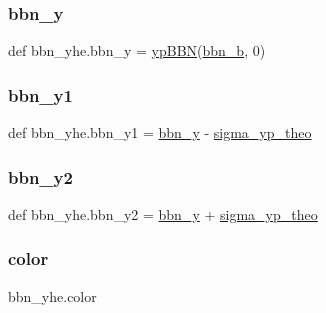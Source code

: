 \subsubsection{\texorpdfstring{bbn\+\_\+y}{bbn\_y}}
{\footnotesize\ttfamily def bbn\+\_\+yhe.\+bbn\+\_\+y = \mbox{\hyperlink{namespacebbn__yhe_a0ae2fc2b1719f17ae48ec9dee3de6728}{yp\+B\+BN}}(\mbox{\hyperlink{namespacebbn__yhe_a8da3e95ccabe26e7b02faafa8d0c7d0a}{bbn\+\_\+b}}, 0)}

\mbox{\label{namespacebbn__yhe_a3f8a67b91f6391a7bd8ea269672ac615}} 
\subsubsection{\texorpdfstring{bbn\+\_\+y1}{bbn\_y1}}
{\footnotesize\ttfamily def bbn\+\_\+yhe.\+bbn\+\_\+y1 = \mbox{\hyperlink{namespacebbn__yhe_a28b53c029dcb7310ef25c077dbf59bab}{bbn\+\_\+y}} -\/ \mbox{\hyperlink{namespacebbn__yhe_a06123892f977e5e00eb0e7bcf6866dbb}{sigma\+\_\+yp\+\_\+theo}}}

\mbox{\label{namespacebbn__yhe_ae522afab9400241fb8bc86962e60e9b5}} 
\subsubsection{\texorpdfstring{bbn\+\_\+y2}{bbn\_y2}}
{\footnotesize\ttfamily def bbn\+\_\+yhe.\+bbn\+\_\+y2 = \mbox{\hyperlink{namespacebbn__yhe_a28b53c029dcb7310ef25c077dbf59bab}{bbn\+\_\+y}} + \mbox{\hyperlink{namespacebbn__yhe_a06123892f977e5e00eb0e7bcf6866dbb}{sigma\+\_\+yp\+\_\+theo}}}

\mbox{\label{namespacebbn__yhe_a5febb2e61726249209662394b5d95858}} 
\subsubsection{\texorpdfstring{color}{color}}
{\footnotesize\ttfamily bbn\+\_\+yhe.\+color}

\mbox{\label{namespacebbn__yhe_a49bc13f65125eafd22fc160f104e8444}} 
